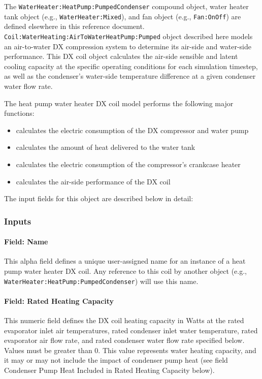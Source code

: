 The \lstinline!WaterHeater:HeatPump:PumpedCondenser! compound object, water heater tank object (e.g., \lstinline!WaterHeater:Mixed!), and fan object (e.g., \lstinline!Fan:OnOff!) are defined elsewhere in this reference document. \lstinline!Coil:WaterHeating:AirToWaterHeatPump:Pumped! object described here models an air-to-water DX compression system to determine its air-side and water-side performance. This DX coil object calculates the air-side sensible and latent cooling capacity at the specific operating conditions for each simulation timestep, as well as the condenser's water-side temperature difference at a given condenser water flow rate.

The heat pump water heater DX coil model performs the following major functions:

\begin{itemize}
\item
  calculates the electric consumption of the DX compressor and water pump
\item
  calculates the amount of heat delivered to the water tank
\item
  calculates the electric consumption of the compressor's crankcase heater
\item
  calculates the air-side performance of the DX coil
\end{itemize}

The input fields for this object are described below in detail:

\subsubsection{Inputs}\label{inputs-27}

\paragraph{Field: Name}\label{field-name-26-000}

This alpha field defines a unique user-assigned name for an instance of a heat pump water heater DX coil. Any reference to this coil by another object (e.g., \lstinline!WaterHeater:HeatPump:PumpedCondenser!) will use this name.

\paragraph{Field: Rated Heating Capacity}\label{field-rated-heating-capacity}

This numeric field defines the DX coil heating capacity in Watts at the rated evaporator inlet air temperatures, rated condenser inlet water temperature, rated evaporator air flow rate, and rated condenser water flow rate specified below. Values must be greater than 0. This value represents water heating capacity, and it may or may not include the impact of condenser pump heat (see field Condenser Pump Heat Included in Rated Heating Capacity below).


